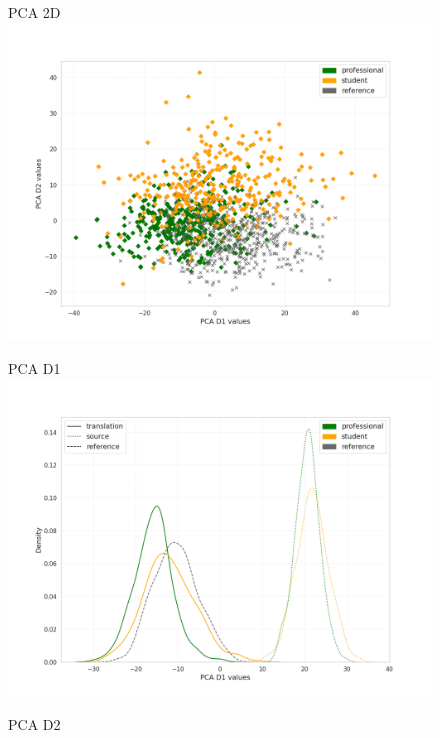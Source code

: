 \begin{figure}[H]
	\begin{minipage}[c]{0.31\linewidth}
		\centering
		PCA	2D 
		\includegraphics[width=\linewidth]{figures/pca/var-ttype-mdeberta3-base-PCA-scatter}
	\end{minipage}	
	\begin{minipage}[c]{0.31\linewidth}
		\centering
		PCA D1
		\includegraphics[width=\linewidth]{figures/pca/src-var-ttype-mdeberta3-base-PCA-D1-lines}
	\end{minipage}
	\begin{minipage}[c]{0.31\linewidth}
		\centering
		PCA D2

\end{minipage}
\end{figure}
